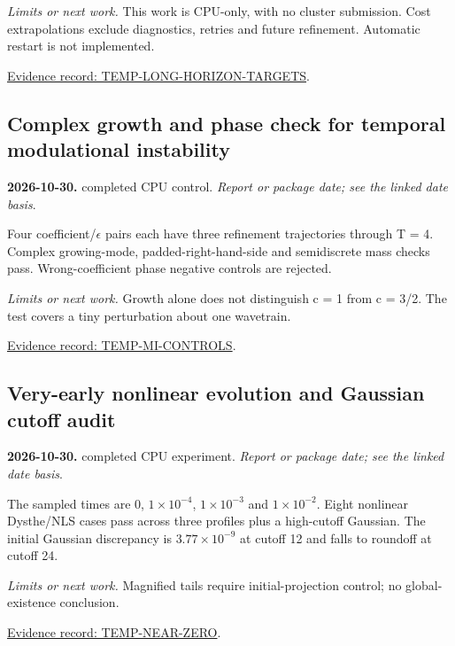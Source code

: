 \documentclass[11pt]{article}
\begin{document}
\noindent\textit{Limits or next work.} This work is CPU-only, with no cluster submission. Cost extrapolations exclude diagnostics, retries and future refinement. Automatic restart is not implemented.

\noindent\href{https://github.com/matasvai/dysthe-paper/blob/codex/research-record-2026-11-05/research-record/2026-11-05/README.md#temp-long-horizon-targets}{Evidence record: TEMP-LONG-HORIZON-TARGETS}.
\subsection*{Complex growth and phase check for temporal modulational instability}
\noindent\textbf{2026-10-30.} completed CPU control. \emph{Report or package date; see the linked date basis}.\par
Four coefficient/$\epsilon$ pairs each have three refinement trajectories through T = 4. Complex growing-mode, padded-right-hand-side and semidiscrete mass checks pass. Wrong-coefficient phase negative controls are rejected.

\noindent\textit{Limits or next work.} Growth alone does not distinguish c = 1 from c = 3/2. The test covers a tiny perturbation about one wavetrain.

\noindent\href{https://github.com/matasvai/dysthe-paper/blob/codex/research-record-2026-11-05/research-record/2026-11-05/README.md#temp-mi-controls}{Evidence record: TEMP-MI-CONTROLS}.
\subsection*{Very-early nonlinear evolution and Gaussian cutoff audit}
\noindent\textbf{2026-10-30.} completed CPU experiment. \emph{Report or package date; see the linked date basis}.\par
The sampled times are 0, $1\times 10^{-4}$, $1\times 10^{-3}$ and $1\times 10^{-2}$. Eight nonlinear Dysthe/NLS cases pass across three profiles plus a high-cutoff Gaussian. The initial Gaussian discrepancy is $3.77\times 10^{-9}$ at cutoff 12 and falls to roundoff at cutoff 24.

\noindent\textit{Limits or next work.} Magnified tails require initial-projection control; no global-existence conclusion.

\noindent\href{https://github.com/matasvai/dysthe-paper/blob/codex/research-record-2026-11-05/research-record/2026-11-05/README.md#temp-near-zero}{Evidence record: TEMP-NEAR-ZERO}.
\end{document}
